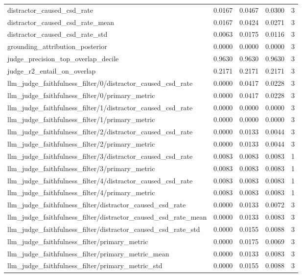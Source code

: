 \begin{table}[h]
\begin{tabular}{lrrrr}
distractor_caused_csd_rate & 0.0167 & 0.0467 & 0.0300 & 3 \\
distractor_caused_csd_rate_mean & 0.0167 & 0.0424 & 0.0271 & 3 \\
distractor_caused_csd_rate_std & 0.0063 & 0.0175 & 0.0116 & 3 \\
grounding_attribution_posterior & 0.0000 & 0.0000 & 0.0000 & 3 \\
judge_precision_top_overlap_decile & 0.9630 & 0.9630 & 0.9630 & 3 \\
judge_r2_entail_on_overlap & 0.2171 & 0.2171 & 0.2171 & 3 \\
llm_judge_faithfulness_filter/0/distractor_caused_csd_rate & 0.0000 & 0.0417 & 0.0228 & 3 \\
llm_judge_faithfulness_filter/0/primary_metric & 0.0000 & 0.0417 & 0.0228 & 3 \\
llm_judge_faithfulness_filter/1/distractor_caused_csd_rate & 0.0000 & 0.0000 & 0.0000 & 3 \\
llm_judge_faithfulness_filter/1/primary_metric & 0.0000 & 0.0000 & 0.0000 & 3 \\
llm_judge_faithfulness_filter/2/distractor_caused_csd_rate & 0.0000 & 0.0133 & 0.0044 & 3 \\
llm_judge_faithfulness_filter/2/primary_metric & 0.0000 & 0.0133 & 0.0044 & 3 \\
llm_judge_faithfulness_filter/3/distractor_caused_csd_rate & 0.0083 & 0.0083 & 0.0083 & 1 \\
llm_judge_faithfulness_filter/3/primary_metric & 0.0083 & 0.0083 & 0.0083 & 1 \\
llm_judge_faithfulness_filter/4/distractor_caused_csd_rate & 0.0083 & 0.0083 & 0.0083 & 1 \\
llm_judge_faithfulness_filter/4/primary_metric & 0.0083 & 0.0083 & 0.0083 & 1 \\
llm_judge_faithfulness_filter/distractor_caused_csd_rate & 0.0000 & 0.0133 & 0.0072 & 3 \\
llm_judge_faithfulness_filter/distractor_caused_csd_rate_mean & 0.0000 & 0.0133 & 0.0083 & 3 \\
llm_judge_faithfulness_filter/distractor_caused_csd_rate_std & 0.0000 & 0.0155 & 0.0088 & 3 \\
llm_judge_faithfulness_filter/primary_metric & 0.0000 & 0.0175 & 0.0069 & 3 \\
llm_judge_faithfulness_filter/primary_metric_mean & 0.0000 & 0.0133 & 0.0083 & 3 \\
llm_judge_faithfulness_filter/primary_metric_std & 0.0000 & 0.0155 & 0.0088 & 3 \\

\end{tabular}
\end{table}
